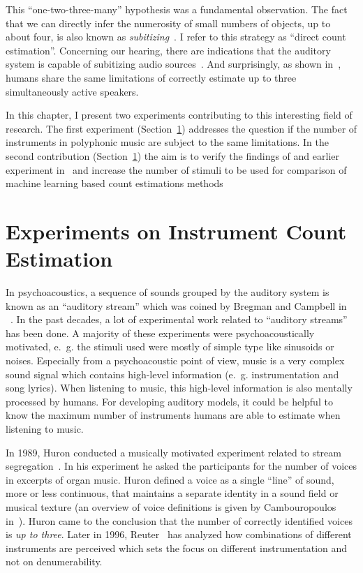 This ``one-two-three-many'' hypothesis was a fundamental observation.
The fact that we can directly infer the numerosity of small numbers of objects, up to about four, is also known as \emph{subitizing}~\cite{kaufman49, burr10}.
I refer to this strategy as ``direct count estimation''.
Concerning our hearing, there are indications that the auditory system is capable of subitizing audio sources~\cite{hoopen79}.
And surprisingly, as shown in~\cite{kashino96, kawashima15}, humans share the same limitations of correctly estimate up to three simultaneously active speakers.
\par
In this chapter, I present two experiments contributing to this interesting field of research.
The first experiment (Section~\ref{sec:ismir}) addresses the question if the number of instruments in polyphonic music are subject to the same limitations.
In the second contribution (Section~\ref{sec:ismir}) the aim is to verify the findings of and earlier experiment in~\cite{kawashima15} and increase the number of stimuli to be used for comparison of machine learning based count estimations methods

\section{Experiments on Instrument Count Estimation}%
\label{sec:ismir}


In psychoacoustics, a sequence of sounds grouped by the auditory system is known as an ``auditory stream'' which was coined by Bregman and Campbell in ~\cite{Bregman1971}.
In the past decades, a lot of experimental work related to ``auditory streams'' has been done\cite{Bregman1990}.
A majority of these experiments were psychoacoustically motivated, e.~g. the stimuli used were mostly of simple type like sinusoids or noises.
Especially from a psychoacoustic point of view, music is a very complex sound signal which contains high-level information (e.~g. instrumentation and song lyrics).
When listening to music, this high-level information is also mentally processed by humans.
For developing auditory models, it could be helpful to know the maximum number of instruments humans are able to estimate when listening to music.
\par
In 1989, Huron conducted a musically motivated experiment related to stream segregation~\cite{Huron1989}. In his experiment he asked the participants for the number of voices in excerpts of organ music.
Huron defined a voice as a single ``line'' of sound, more or less continuous, that maintains a separate identity in a sound field or musical texture (an overview of voice definitions is given by Cambouropoulos in~\cite{Cambouropoulos2008}).
Huron came to the conclusion that the number of correctly identified voices is \emph{up to three}.
Later in 1996, Reuter~\cite{reuter96} has analyzed how combinations of different instruments are perceived which sets the focus on different instrumentation and not on denumerability.

